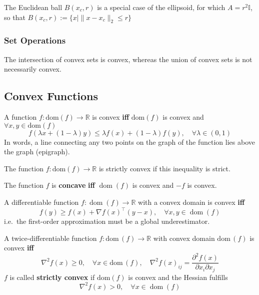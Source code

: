 The Euclidean ball $B(x_c,r)$ is a special case of the ellipsoid, for which $A=r^2 \mathbb{I}$, so that $B(x_c,r):=\{x| \|x-x_c\|_2\leq r\}$

\subsubsection{Set Operations}
The intersection of convex sets is convex, whereas the union of convex sets is not necessarily convex.
\subsection{Convex Functions}
A function $f:\text{dom}(f) \rightarrow \mathbb{R}$ is convex \textbf{iff} $\text{dom}(f)$ is convex and $\forall x,y \in \text{dom}(f)$
\begin{equation*}
    f(\lambda x + (1-\lambda)y) \leq \lambda f(x) + (1-\lambda)f(y),\quad \forall \lambda \in (0,1)
\end{equation*}
In words, a line connecting any two points on the graph of the function lies above the graph (epigraph).

\newpar{}
The function $f:\text{dom}(f) \rightarrow \mathbb{R}$ is strictly convex if this inequality is strict.

\newpar{}
The function $f$ is \textbf{concave} \textbf{iff} $\operatorname{dom}(f)$ is convex and $-f$ is convex.

\newpar{}

A differentiable function $f: \operatorname{dom}(f) \to \mathbb{R}$ with a convex domain is convex \textbf{iff}
\begin{equation*}
    f(y) \geq f(x) + \nabla {f(x)}^{\top}(y-x), \quad \forall x, y \in \operatorname{dom}(f)
\end{equation*}
i.e.\ the first-order approximation must be a global underestimator.

\newpar{}

A twice-differentiable function $f : \text{dom}\,(f) \to \mathbb{R}$ with convex domain $\text{dom}\,(f)$ is convex \textbf{iff}
\begin{equation*}
    \nabla^2 f(x) \geq 0, \quad \forall x \in \text{dom}\,(f), \quad \nabla^2 {f(x)}_{ij} = \frac{\partial^2 f(x)}{\partial x_i \partial x_j}
\end{equation*}
\newpar{}
$f$ is called \textbf{strictly convex} if $\text{dom}(f)$ is convex and the Hessian fulfills
\begin{equation*}
    \nabla^2 f(x) > 0, \quad \forall x\in \operatorname{dom}(f)
\end{equation*}

